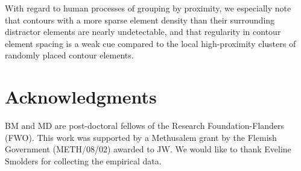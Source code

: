 \documentclass[12pt]{article}
\begin{document}
With regard to human processes of grouping by proximity, we especially note that contours with a more sparse element density than their surrounding distractor elements are nearly undetectable, and that regularity in contour element spacing is a weak cue compared to the local high-proximity clusters of randomly placed contour elements.


\section{Acknowledgments}
BM and MD are post-doctoral fellows of the Research Foundation-Flanders (FWO). This work was supported by a Methusalem grant by the Flemish Government (METH/08/02) awarded to JW. We would like to thank Eveline Smolders for collecting the empirical data.



{}





\end{document}
